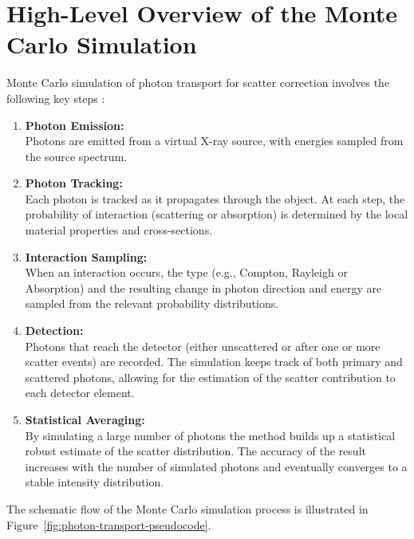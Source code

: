 \section{High-Level Overview of the Monte Carlo Simulation}

Monte Carlo simulation of photon transport for scatter correction involves the
following key steps \cite{mcffd2011}:

\begin{enumerate}
    \item \textbf{Photon Emission:} \\
        Photons are emitted from a virtual X-ray source, with energies sampled
        from the source spectrum.
    \item \textbf{Photon Tracking:} \\
        Each photon is tracked as it propagates through the object. At each
        step, the probability of interaction (scattering or absorption) is
        determined by the local material properties and cross-sections.
    \item \textbf{Interaction Sampling:} \\
        When an interaction occurs, the type (e.g., Compton, Rayleigh or
        Absorption) and the resulting change in photon direction and energy are
        sampled from the relevant probability distributions.
    \item \textbf{Detection:} \\
        Photons that reach the detector (either unscattered or after one or more
        scatter events) are recorded. The simulation keeps track of both primary
        and scattered photons, allowing for the estimation of the scatter
        contribution to each detector element.
    \item \textbf{Statistical Averaging:} \\
        By simulating a large number of photons the method builds up a
        statistical robust estimate of the scatter distribution. The accuracy of
        the result increases with the number of simulated photons and eventually
        converges to a stable intensity distribution.
\end{enumerate}

The schematic flow of the Monte Carlo simulation process is illustrated in
Figure~\ref{fig:photon-transport-pseudocode}.

